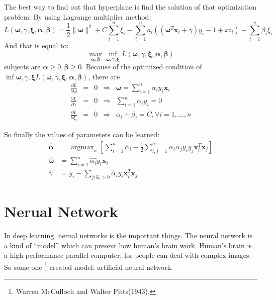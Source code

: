 \documentclass{article}
\begin{document}
The best way to find out that hyperplane is find the solution of that optimization problem.
By using Lagrange multiplier method\cite{GraphML1}:
\begin{equation}
  \label{eq:lagrange-multiplier-method}
  L(\mathbf{\omega},\gamma,\mathbf{\xi},\mathbf{\alpha},\mathbf{\beta}) =
  \frac{1}{2}\parallel\mathbf{\omega}\parallel^2+C\sum\limits_{i=1}^{n}\xi_i
  - \sum\limits_{i=1}^{n}a_i\left(\left(\mathbf{\omega}^T\mathbf{x}_i+\gamma\right)y_i-1+
  xi_i\right) - \sum\limits_{i=1}^{n}\beta_i\xi_i
\end{equation}
And that is equal to:
\begin{equation}
\max\limits_{\mathbf{\alpha},\mathbf{\beta}}\inf\limits_{\mathbf{\omega},\gamma,\mathbf{\xi}}
 L(\mathbf{\omega},\gamma,\mathbf{\xi},\mathbf{\alpha},\mathbf{\beta})
\end{equation}
subjects are $\mathbf{\alpha} \geq 0,\mathbf{\beta} \geq 0$.
Because of the optimized condition of $\inf{\mathbf{\omega},\gamma,\mathbf{\xi}}
L(\mathbf{\omega},\gamma,\mathbf{\xi},\mathbf{\alpha},\mathbf{\beta})$,
there are
$$\begin{array}{ccccl}
\frac{\partial L}{\partial \mathbf{\omega}} & = & 0 & \Rightarrow & \mathbf{\omega} = \sum\limits_{i=1}^{n}\alpha_iy_i\mathbf{x}_i \\
\frac{\partial L}{\partial \gamma} & = & 0 & \Rightarrow & \sum\limits_{i=1}^{n}\alpha_iy_i = 0 \\
\frac{\partial L}{\partial \xi_i} & = & 0 & \Rightarrow & \alpha_i + \beta_i = C, \forall i=1,\dots,n
\end{array}
$$

So finally the values of parameters can be learned:
\begin{align}
\hat{\mathbf{\alpha}} &= \mathop{argmax}_\alpha\left[\sum\limits_{i=1}^{n}\alpha_i-\frac{1}{2}\sum\limits_{i,j=1}^{n}\alpha_i\alpha_jy_iy_j\mathbf{x}^T_i\mathbf{x}_j \right]
\\
\hat{\mathbf{\omega}} &= \sum\limits_{i=1}^{n}\hat{\alpha_i}y_i\mathbf{x}_i
\\
\hat{\gamma} &= y_i - \sum\limits_{j:\hat{\alpha}_i>0}\hat{\alpha}_iy_i\mathbf{x}_i^T\mathbf{x}_j
\end{align}


\section{Nerual Network}
\label{sec:nn}

In deep learning, nerual networks is the important things.
The neural network is a kind of ``model'' which can present how human's brain work.
Human's brain is a high performance parallel computer, for people can deal with complex images\cite{NNnML1}.
So some one%
\footnote{Warren McCulloch and Walter Pitts(1943),\cite{McCulloch194}}
created model: artificial neural network.
\end{document}
